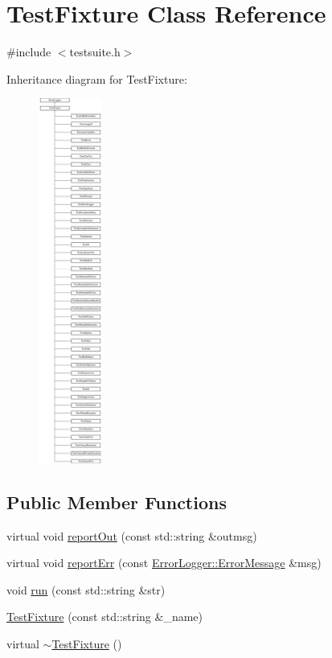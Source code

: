 \hypertarget{class_test_fixture}{\section{Test\-Fixture Class Reference}
\label{class_test_fixture}
}


{\ttfamily \#include $<$testsuite.\-h$>$}

Inheritance diagram for Test\-Fixture\-:\begin{figure}[H]
\begin{center}
\leavevmode
\includegraphics[height=12.000000cm]{class_test_fixture}
\end{center}
\end{figure}
\subsection*{Public Member Functions}
\begin{DoxyCompactItemize}
\item 
virtual void \hyperlink{class_test_fixture_a43619b0701cef097c0a1804dff84c9fa}{report\-Out} (const std\-::string \&outmsg)
\item 
virtual void \hyperlink{class_test_fixture_a254cc49644165b09c40daa042f603def}{report\-Err} (const \hyperlink{class_error_logger_1_1_error_message}{Error\-Logger\-::\-Error\-Message} \&msg)
\item 
void \hyperlink{class_test_fixture_ab80c59ba18ecf97a852b601715b014b7}{run} (const std\-::string \&str)
\item 
\hyperlink{class_test_fixture_a515ce975e2c6ca8567f0c1bb5455cae9}{Test\-Fixture} (const std\-::string \&\-\_\-name)
\item 
virtual \hyperlink{class_test_fixture_a3ac71cd5a494f2ed4c5b15fdbb426c8b}{$\sim$\-Test\-Fixture} ()
\end{DoxyCompactItemize}
